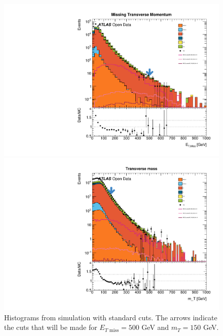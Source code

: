 \documentclass[11pt]{article}
\begin{document}
\begin{figure}[H]
\centering

\begin{minipage}{.5\textwidth}
  \centering
  \includegraphics[width=1.\linewidth]{plots/Standard_Cut/cropped_etmiss_edited.pdf}
\end{minipage}%
\begin{minipage}{.5\textwidth}
  \centering
  \includegraphics[width=1.\linewidth]{plots/Standard_Cut/cropped_mt_edited.pdf}
\end{minipage}

\caption{Histograms from simulation with standard cuts. The arrows indicate the cuts that will be made for $E_{T \text{ miss}} = 500$ GeV and $m_T = 150$ GeV.}
\label{fig:: standard cuts hist}
\end{figure}
\end{document}
